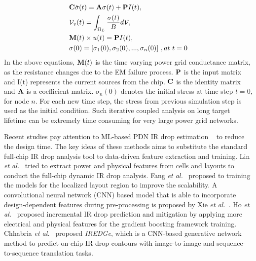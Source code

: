 \begin{align}
	\label{eq:em}
	\begin{split}
		&{\bf C} \dot{\sigma}(t)  = {\bf A} \sigma(t) + {\bf P}I(t),  \\
		&\mathcal{V}_v(t)  = \int_{\Omega_L}\frac{\sigma(t)}{B}d\mathcal{V},  \\ 
		&{\bf M}(t) \times u(t)  = {\bf P} I(t), \\
		&{\bf \sigma}(0)  = [\sigma_1(0), \sigma_2(0), ..., \sigma_n(0)] \,\, ,at \,\, t = 0 
	\end{split}
\end{align}
In the above equations, ${\bf M}(t)$ is the time varying power grid conductance matrix, as the resistance changes due to the EM failure process. ${{\bf P}}$ is the input matrix and I(t) represents the current sources from the chip. ${{\bf C}}$ is the identity matrix and ${{\bf A}}$ is a coefficient matrix. $\sigma_{n}(0)$ denotes the initial stress at time step $t = 0$, for node $n$. For each new time step, the stress from previous simulation step is used as the initial condition. Such iterative coupled analysis on long target lifetime can be extremely time consuming for very large power grid networks.






Recent studies pay attention to ML-based PDN IR drop estimation ~\cite{LinFang:2018vts,Fang:2018dynireco,HoKahng:ICCAD'19,Xie:2020powernet,Sachin:ASPDAC'21} to reduce the design time. 
The key ideas of these methods aims to substitute the standard full-chip IR drop analysis tool to data-driven feature extraction and training. Lin {\it et al.}~\cite{LinFang:2018vts} tried to extract power and physical features from cells and layouts to conduct the full-chip dynamic IR drop analysis. Fang {\it et al.}~\cite{Fang:2018dynireco} proposed to training the models for the localized layout region to improve the scalability.  A convolutional neural network (CNN) based model that is able to incorporate design-dependent features during pre-processing is proposed by Xie {\it et al.}~\cite{Xie:2020powernet}. Ho {\it et al.}~\cite{HoKahng:ICCAD'19} proposed incremental IR drop prediction and mitigation by applying more electrical and physical features for the gradient boosting framework training. Chhabria {\it et al.}~\cite{Sachin:ASPDAC'21} proposed {\it IREDGe}, which is a CNN-based generative network method to predict on-chip IR drop contours with image-to-image and sequence-to-sequence translation tasks. 

